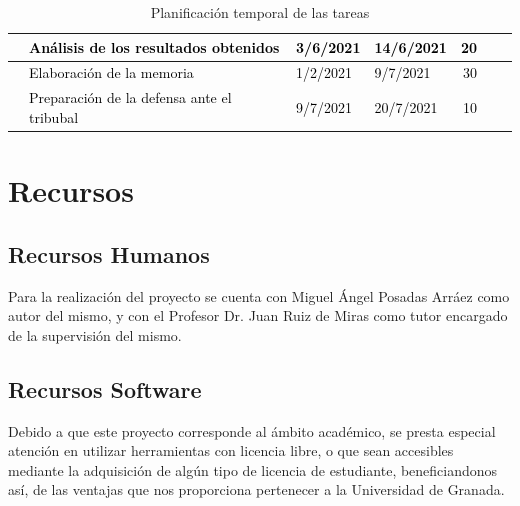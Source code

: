 \begin{table}[H]
\begin{adjustbox}{max height=\textheight, max width=\textwidth}
\begin{tabular}{|clllrrl|}
    \hline
    \rowcolor{white} \multicolumn{1}{|l}{}  & \textcolor{black}{Análisis de los resultados obtenidos} & \textcolor{black}{3/6/2021}         & \textcolor{black}{14/6/2021} &\textcolor{black}{20}&\\
    \hline
    \rowcolor{white} \multicolumn{1}{|l}{}  & \textcolor{black}{Elaboración de la memoria} & \textcolor{black}{1/2/2021}         & \textcolor{black}{9/7/2021} &\textcolor{black}{30}&\\
    \hline
    \rowcolor{white} \multicolumn{1}{|l}{}  & \textcolor{black}{Preparación de la defensa ante el tribubal} & \textcolor{black}{9/7/2021}         & \textcolor{black}{20/7/2021} &\textcolor{black}{10}&\\                                  
    \hline
    \end{tabular}
    \end{adjustbox}
    \caption{Planificación temporal de las tareas}
    \label{fig:Planificacion}
\end{table}

\section{Recursos}
\subsection{Recursos Humanos}
Para la realización del proyecto se cuenta con Miguel Ángel Posadas Arráez como autor del mismo, y con el Profesor Dr. Juan Ruiz de Miras como tutor encargado de la supervisión del mismo.

\subsection{Recursos Software}
\label{RecursosSoftware}
Debido a que este proyecto corresponde al ámbito académico, se presta especial atención en utilizar herramientas con licencia libre, o que sean accesibles mediante la adquisición de algún tipo de licencia de estudiante, beneficiandonos así, de las ventajas que nos proporciona pertenecer a la Universidad de Granada.\\

